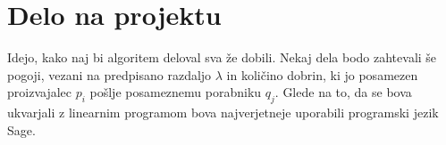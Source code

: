 \documentclass[a4paper, pt14]{article}
\begin{document}
\section{Delo na projektu}
Idejo, kako naj bi algoritem deloval sva že dobili. Nekaj dela bodo zahtevali še pogoji, vezani na predpisano razdaljo $\lambda$ in količino dobrin, ki jo posamezen proizvajalec $p_i$ pošlje posameznemu porabniku $q_j$. Glede na to, da se bova ukvarjali z linearnim programom bova najverjetneje uporabili programski jezik Sage.
\end{document}

